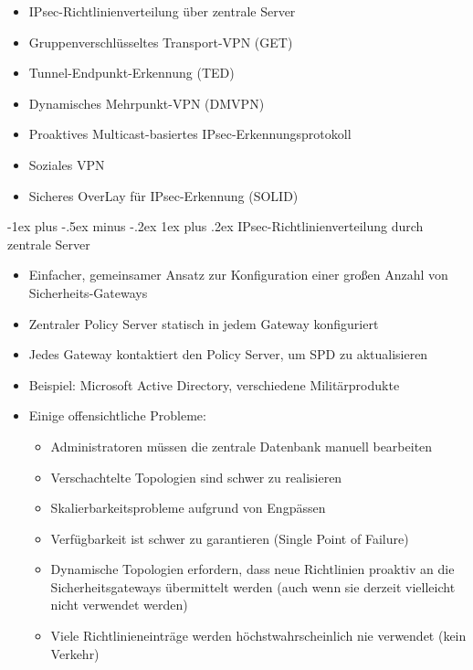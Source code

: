 \documentclass[a4paper]{article}
\makeatletter
\renewcommand{\subsubsection}{\@startsection{subsubsection}{3}{0mm}%
 {-1ex plus -.5ex minus -.2ex}%
 {1ex plus .2ex}%
 {\normalfont\small\bfseries}}
\makeatother
\begin{document}
\begin{multicols}{3}
    \begin{itemize}
        \item
              IPsec-Richtlinienverteilung über zentrale Server
        \item
              Gruppenverschlüsseltes Transport-VPN (GET)
        \item
              Tunnel-Endpunkt-Erkennung (TED)
        \item
              Dynamisches Mehrpunkt-VPN (DMVPN)
        \item
              Proaktives Multicast-basiertes IPsec-Erkennungsprotokoll
        \item
              Soziales VPN
        \item
              Sicheres OverLay für IPsec-Erkennung (SOLID)
    \end{itemize}


    \subsubsection{IPsec-Richtlinienverteilung durch zentrale
        Server}

    \begin{itemize}
        \item
              Einfacher, gemeinsamer Ansatz zur Konfiguration einer großen Anzahl
              von Sicherheits-Gateways
        \item
              Zentraler Policy Server statisch in jedem Gateway konfiguriert
        \item
              Jedes Gateway kontaktiert den Policy Server, um SPD zu aktualisieren
        \item
              Beispiel: Microsoft Active Directory, verschiedene Militärprodukte
        \item
              Einige offensichtliche Probleme:

              \begin{itemize}
                  \item
                        Administratoren müssen die zentrale Datenbank manuell bearbeiten
                  \item
                        Verschachtelte Topologien sind schwer zu realisieren
                  \item
                        Skalierbarkeitsprobleme aufgrund von Engpässen
                  \item
                        Verfügbarkeit ist schwer zu garantieren (Single Point of Failure)
                  \item
                        Dynamische Topologien erfordern, dass neue Richtlinien proaktiv an
                        die Sicherheitsgateways übermittelt werden (auch wenn sie derzeit
                        vielleicht nicht verwendet werden)
                  \item
                        Viele Richtlinieneinträge werden höchstwahrscheinlich nie verwendet
                        (kein Verkehr)
              \end{itemize}
    \end{itemize}



\end{multicols}
\end{document}
